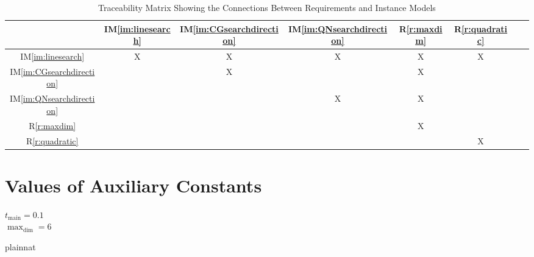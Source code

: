 \documentclass[12pt]{article}
\begin{document}
\begin{table}[h!]
\centering
\begin{tabular}{|c|c|c|c|c|c|c|c|}
\hline
	& IM\ref{im:linesearch}& IM\ref{im:CGsearchdirection}& IM\ref{im:QNsearchdirection}& R\ref{r:maxdim}& R\ref{r:quadratic} \\
\hline
IM\ref{im:linesearch}            &X &X &X &X &X  \\ \hline
IM\ref{im:CGsearchdirection}            & & X& & X&  \\ \hline
IM\ref{im:QNsearchdirection}          & & & X& X&  \\ \hline
R\ref{r:maxdim}          & & & &X &  \\ \hline
R\ref{r:quadratic}     & & & & & X \\ \hline
\end{tabular}
\caption{Traceability Matrix Showing the Connections Between Requirements and Instance Models}
\label{Table:R_trace}
\end{table}







\section{Values of Auxiliary Constants}

$t_{\text{main}} = 0.1$
\\
$\max_{\text{dim}} = 6$

\newpage

 {plainnat}





\end{document}
